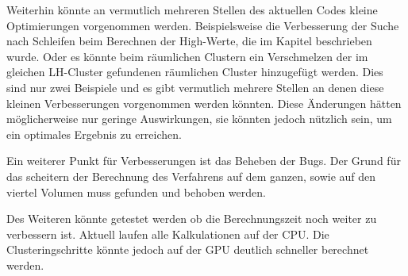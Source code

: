 Weiterhin könnte an vermutlich mehreren Stellen des aktuellen Codes kleine Optimierungen vorgenommen werden.
\newline
Beispielsweise die Verbesserung der Suche nach Schleifen beim Berechnen der High-Werte, die im Kapitel  beschrieben wurde.
\newline
Oder es könnte beim räumlichen Clustern ein Verschmelzen der im gleichen LH-Cluster gefundenen räumlichen Cluster hinzugefügt werden.
\newline
Dies sind nur zwei Beispiele und es gibt vermutlich mehrere Stellen an denen diese kleinen Verbesserungen vorgenommen werden könnten.
\newline
Diese Änderungen hätten möglicherweise nur geringe Auswirkungen, sie  könnten jedoch nützlich sein, um ein optimales Ergebnis zu erreichen.


Ein weiterer Punkt für Verbesserungen ist das Beheben der Bugs. Der Grund für das scheitern der Berechnung des Verfahrens auf dem ganzen, sowie auf den viertel Volumen muss gefunden und behoben werden.


Des Weiteren könnte getestet werden ob die Berechnungszeit noch weiter zu verbessern ist. Aktuell laufen alle Kalkulationen auf der CPU. Die Clusteringschritte könnte jedoch auf der GPU deutlich schneller berechnet werden.


